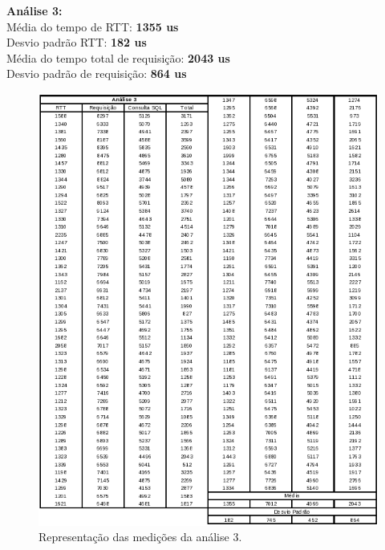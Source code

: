 \documentclass[11pt,twoside]{article}
\begin{document}
\textbf{Análise 3: }\\
Média do tempo de RTT: \textbf{1355 us}\\
Desvio padrão RTT: \textbf{182 us}\\
Média do tempo total de requisição: \textbf{2043 us}\\
Desvio padrão de requisição: \textbf{864 us}\\
\begin{figure}[htb]
  \centering
  \includegraphics[width=15cm]{analise3.png} 
  \caption{Representação das medições da análise 3.}
  \label{fig:analise3}
\end{figure}
\end{document}

